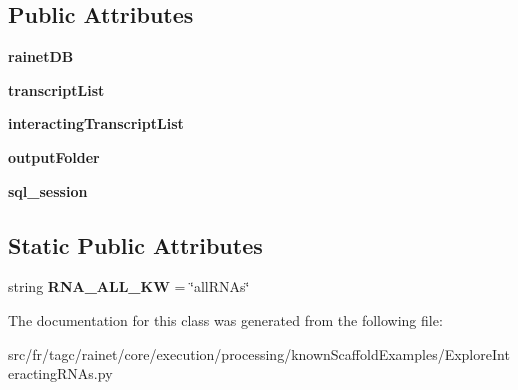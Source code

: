\subsection*{Public Attributes}
\begin{DoxyCompactItemize}
\item 
\hypertarget{classExploreInteractingRNAs_1_1ExploreInteractingRNAs_a9766a57b46e4c757fea56d982dcf4c1d}{{\bfseries rainet\-D\-B}}\label{classExploreInteractingRNAs_1_1ExploreInteractingRNAs_a9766a57b46e4c757fea56d982dcf4c1d}

\item 
\hypertarget{classExploreInteractingRNAs_1_1ExploreInteractingRNAs_a44e475ab1d8de56637448d5e97ce2001}{{\bfseries transcript\-List}}\label{classExploreInteractingRNAs_1_1ExploreInteractingRNAs_a44e475ab1d8de56637448d5e97ce2001}

\item 
\hypertarget{classExploreInteractingRNAs_1_1ExploreInteractingRNAs_a6c783199f4b5ad292531b5cc906444d6}{{\bfseries interacting\-Transcript\-List}}\label{classExploreInteractingRNAs_1_1ExploreInteractingRNAs_a6c783199f4b5ad292531b5cc906444d6}

\item 
\hypertarget{classExploreInteractingRNAs_1_1ExploreInteractingRNAs_afb54fb60daa74e958ada65c925a5c416}{{\bfseries output\-Folder}}\label{classExploreInteractingRNAs_1_1ExploreInteractingRNAs_afb54fb60daa74e958ada65c925a5c416}

\item 
\hypertarget{classExploreInteractingRNAs_1_1ExploreInteractingRNAs_a7c2ff7ec8203c24467db6b0ad66578ed}{{\bfseries sql\-\_\-session}}\label{classExploreInteractingRNAs_1_1ExploreInteractingRNAs_a7c2ff7ec8203c24467db6b0ad66578ed}

\end{DoxyCompactItemize}
\subsection*{Static Public Attributes}
\begin{DoxyCompactItemize}
\item 
\hypertarget{classExploreInteractingRNAs_1_1ExploreInteractingRNAs_a06a679952025f5a49ae1cbed1f407471}{string {\bfseries R\-N\-A\-\_\-\-A\-L\-L\-\_\-\-K\-W} = \char`\"{}all\-R\-N\-As\char`\"{}}\label{classExploreInteractingRNAs_1_1ExploreInteractingRNAs_a06a679952025f5a49ae1cbed1f407471}

\end{DoxyCompactItemize}


The documentation for this class was generated from the following file\-:\begin{DoxyCompactItemize}
\item 
src/fr/tagc/rainet/core/execution/processing/known\-Scaffold\-Examples/Explore\-Interacting\-R\-N\-As.\-py\end{DoxyCompactItemize}
